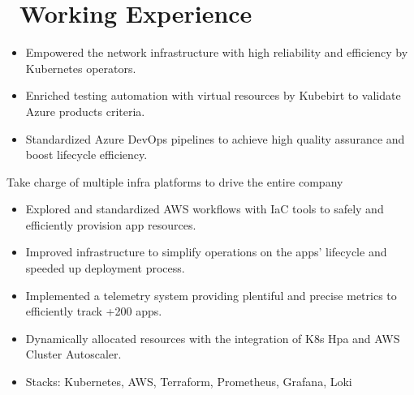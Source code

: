 \documentclass{resume}
\begin{document}
\section{\faUsers\ Working Experience}
\begin{itemize}
  \item Empowered the network infrastructure with high reliability and efficiency by Kubernetes operators.
  \item Enriched testing automation with virtual resources by Kubebirt to validate Azure products criteria.
  \item Standardized Azure DevOps pipelines to achieve high quality assurance and boost lifecycle efficiency.
\end{itemize}

Take charge of multiple infra platforms to drive the entire company
\begin{itemize}
  \item Explored and standardized AWS workflows with IaC tools to safely and efficiently provision app resources.
  \item Improved infrastructure to simplify operations on the apps' lifecycle and speeded up deployment process.
  \item Implemented a telemetry system providing plentiful and precise metrics to efficiently track +200 apps.
  \item Dynamically allocated resources with the integration of K8s Hpa and AWS Cluster Autoscaler.
  \item Stacks: Kubernetes, AWS, Terraform, Prometheus, Grafana, Loki
\end{itemize}
\end{document}
